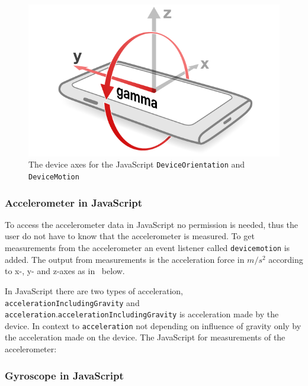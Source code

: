 \begin{figure}[H]
\begin{minipage}[c]{.23\textwidth}
    \centering
    \includegraphics[scale=0.2]{img/device-gamma}
    \hspace{1cm}
  \end{minipage}
  \caption{The device axes for the JavaScript \texttt{DeviceOrientation} and \texttt{DeviceMotion}}
  \label{fig:device-rot}
\end{figure}

\subsubsection{Accelerometer in JavaScript}
To access the accelerometer data in JavaScript no permission is needed, thus the user do not have to know that the accelerometer is measured. To get measurements from the accelerometer an event listener called \texttt{devicemotion} is added. The output from measurements is the acceleration force in $m/s^2$ according to x-, y- and z-axes as in~ below. 

In JavaScript there are two types of acceleration, \texttt{accelerationIncludingGravity} and \texttt{acceleration}.\texttt{accelerationIncludingGravity} is acceleration made by the device. In context to \texttt{acceleration} not depending on influence of gravity only by the acceleration made on the device. 
The JavaScript for measurements of the accelerometer:

\cite[]{sensor:DeviceOrientation:spec}

\subsubsection{Gyroscope in JavaScript}